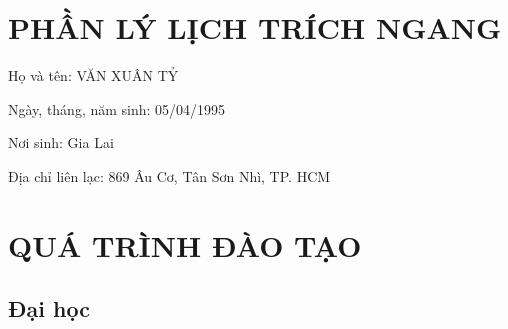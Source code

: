 \section*{PHẦN LÝ LỊCH TRÍCH NGANG}
Họ và tên: VĂN XUÂN TỶ

Ngày, tháng, năm sinh: 05/04/1995

Nơi sinh: Gia Lai

Địa chỉ liên lạc: 869 Âu Cơ, Tân Sơn Nhì, TP. HCM
\section*{QUÁ TRÌNH ĐÀO TẠO}
\subsection*{Đại học}

